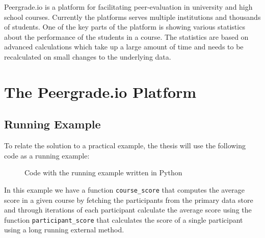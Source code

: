 Peergrade.io is a platform for facilitating peer-evaluation in university and high school courses. Currently the platforms serves multiple institutions and thousands of students. One of the key parts of the platform is showing various statistics about the performance of the students in a course. The statistics are based on advanced calculations which take up a large amount of time and needs to be recalculated on small changes to the underlying data.

\section{The Peergrade.io Platform}
\label{sec:the-peergrade-io-platform}




\subsection{Running Example}
\label{subsec:running-example}

To relate the solution to a practical example, the thesis will use the following code as a running example:

\begin{figure*}[ht!]
  
  \caption{Code with the running example written in Python}
  \label{code:running-example}
\end{figure*}

In this example we have a function \verb$course_score$ that computes the average score in a given course by fetching the participants from the primary data store and through iterations of each participant calculate the average score using the function \verb$participant_score$ that calculates the score of a single participant using a long running external method.

